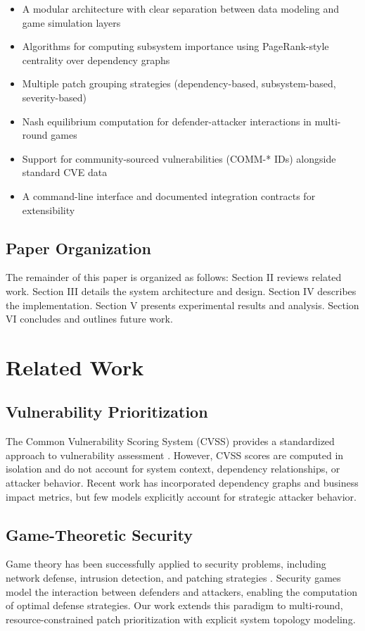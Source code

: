 \documentclass[conference]{IEEEtran}
\begin{document}
\begin{itemize}
    \item A modular architecture with clear separation between data modeling and game simulation layers
    \item Algorithms for computing subsystem importance using PageRank-style centrality over dependency graphs
    \item Multiple patch grouping strategies (dependency-based, subsystem-based, severity-based)
    \item Nash equilibrium computation for defender-attacker interactions in multi-round games
    \item Support for community-sourced vulnerabilities (COMM-* IDs) alongside standard CVE data
    \item A command-line interface and documented integration contracts for extensibility
\end{itemize}

\subsection{Paper Organization}
The remainder of this paper is organized as follows: Section II reviews related work. Section III details the system architecture and design. Section IV describes the implementation. Section V presents experimental results and analysis. Section VI concludes and outlines future work.

\section{Related Work}

\subsection{Vulnerability Prioritization}
The Common Vulnerability Scoring System (CVSS) provides a standardized approach to vulnerability assessment \cite{cvss}. However, CVSS scores are computed in isolation and do not account for system context, dependency relationships, or attacker behavior. Recent work has incorporated dependency graphs and business impact metrics, but few models explicitly account for strategic attacker behavior.

\subsection{Game-Theoretic Security}
Game theory has been successfully applied to security problems, including network defense, intrusion detection, and patching strategies \cite{tambe2011, alpcan2010}. Security games model the interaction between defenders and attackers, enabling the computation of optimal defense strategies. Our work extends this paradigm to multi-round, resource-constrained patch prioritization with explicit system topology modeling.
\end{document}
